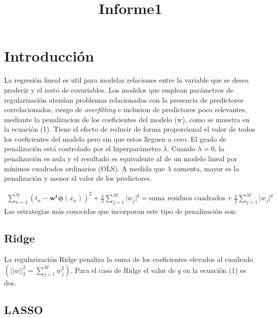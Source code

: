 \documentclass[11pt]{article}
\title{Informe1}
\begin{document}
    
    \maketitle
    
    

    
    

    \hypertarget{introducciuxf3n}{%
\section{\texorpdfstring{\textbf{Introducción}}{Introducción}}\label{introducciuxf3n}}

    La regresión lineal es util para modelar relaciones entre la variable
que se desea predecir y el resto de covariables. Los modelos que emplean
parámetros de regularización atenúan problemas relacionados con la
presencia de predictores correlacionados, riesgo de \textit{overfitting}
e inclusion de predictores poco relevantes, mediante la penalizacion de
los coeficientes del modelo (w), como se muestra en la ecuación (1).
Tiene el efecto de reducir de forma proporcional el valor de todos los
coeficientes del modelo pero sin que estos lleguen a cero. El grado de
penalización está controlado por el hiperparámetro \(\lambda\). Cuando
\(\lambda = 0\), la penalización es nula y el resultado es equivalente
al de un modelo lineal por mínimos cuadrados ordinarios (OLS). A medida
que \(\lambda\) aumenta, mayor es la penalización y menor el valor de
los predictores.

\begin{align}
    \sum^N_{n=1}(t_n - \boldsymbol{w^t\phi}(x_n))^2 + \frac{\lambda}{2} \sum^M_{j=1} \lvert w_j \rvert ^q = \text{suma residuos cuadrados} + \frac{\lambda}{2} \sum^M_{j=1}\lvert w_j \rvert^q
    \label{eq1}
\end{align} Las estrategias más conocidas que incorporan este tipo de
penalización son:

\hypertarget{ridge}{%
\subsection{Ridge}\label{ridge}}

La regularización Ridge penaliza la suma de los coeficientes elevados al
cuadrado \((||w||^2_2 = \sum_{j=1} ^M w^2_j)\). Para el caso de Ridge el
valor de \(q\) en la ecuación (1) es dos.

\hypertarget{lasso}{%
\subsection{LASSO}\label{lasso}}
\end{document}
